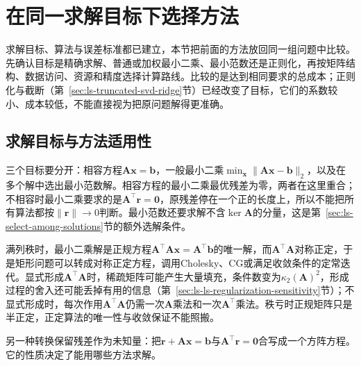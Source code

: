 \section{在同一求解目标下选择方法}
\label{sec:ls-method-selection}

求解目标、算法与误差标准都已建立，本节把前面的方法放回同一组问题中比较。先确认目标是精确求解、普通或加权最小二乘、最小范数还是正则化，再按矩阵结构、数据访问、资源和精度选择计算路线。比较的是达到相同要求的总成本；正则化与截断（第~\ref{sec:ls-truncated-svd-ridge}节）已经改变了目标，它们的系数较小、成本较低，不能直接视为把原问题解得更准确。

\subsection{求解目标与方法适用性}
\label{sec:ls-method-selection-goals}

三个目标要分开：相容方程$\bm A\bm x=\bm b$，一般最小二乘$\min_{\bm x}\lVert\bm A\bm x-\bm b\rVert_2$，以及在多个解中选出最小范数解。相容方程的最小二乘最优残差为零，两者在这里重合；不相容时最小二乘要求的是$\bm A^\top\bm r=\bm0$，原残差停在一个正的长度上，所以不能把所有算法都按$\lVert\bm r\rVert\to0$判断。最小范数还要求解不含$\ker\bm A$的分量，这是第~\ref{sec:ls-select-among-solutions}节的额外选解条件。

满列秩时，最小二乘解是正规方程$\bm A^\top\bm A\bm x=\bm A^\top\bm b$的唯一解，而$\bm A^\top\bm A$对称正定，于是矩形问题可以转成对称正定方程，调用Cholesky、CG或满足收敛条件的定常迭代。显式形成$\bm A^\top\bm A$时，稀疏矩阵可能产生大量填充，条件数变为$\kappa_2(\bm A)^2$，形成过程的舍入还可能丢掉有用的信息（第~\ref{sec:ls-ls-regularization-sensitivity}节）；不显式形成时，每次作用$\bm A^\top\bm A$仍需一次$\bm A$乘法和一次$\bm A^\top$乘法。秩亏时正规矩阵只是半正定，正定算法的唯一性与收敛保证不能照搬。

另一种转换保留残差作为未知量：把$\bm r+\bm A\bm x=\bm b$与$\bm A^\top\bm r=\bm0$合写成一个方阵方程。它的性质决定了能用哪些方法求解。

